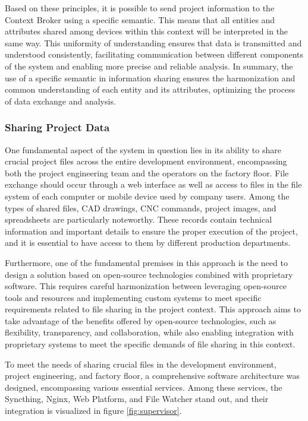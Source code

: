 Based on these principles, it is possible to send project information to the Context Broker using a specific semantic. This means that all entities and attributes shared among devices within this context will be interpreted in the same way. This uniformity of understanding ensures that data is transmitted and understood consistently, facilitating communication between different components of the system and enabling more precise and reliable analysis. In summary, the use of a specific semantic in information sharing ensures the harmonization and common understanding of each entity and its attributes, optimizing the process of data exchange and analysis.

\subsubsection{Sharing Project Data}\label{subsubsection:SharingProjectData}

One fundamental aspect of the system in question lies in its ability to share crucial project files across the entire development environment, encompassing both the project engineering team and the operators on the factory floor. File exchange should occur through a web interface as well as access to files in the file system of each computer or mobile device used by company users. Among the types of shared files, CAD drawings, CNC commands, project images, and spreadsheets are particularly noteworthy. These records contain technical information and important details to ensure the proper execution of the project, and it is essential to have access to them by different production departments.

Furthermore, one of the fundamental premises in this approach is the need to design a solution based on open-source technologies combined with proprietary software. This requires careful harmonization between leveraging open-source tools and resources and implementing custom systems to meet specific requirements related to file sharing in the project context. This approach aims to take advantage of the benefits offered by open-source technologies, such as flexibility, transparency, and collaboration, while also enabling integration with proprietary systems to meet the specific demands of file sharing in this context.

To meet the needs of sharing crucial files in the development environment, project engineering, and factory floor, a comprehensive software architecture was designed, encompassing various essential services. Among these services, the Syncthing, Nginx, Web Platform, and File Watcher stand out, and their integration is visualized in figure \ref{fig:supervisor}.

